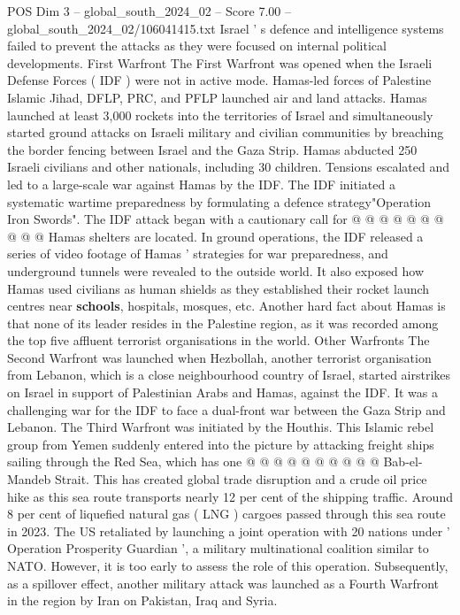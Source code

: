 \begin{textsample}{POS Dim 3 – global\_south\_2024\_02 – Score 7.00 – global\_south\_2024\_02/106041415.txt}
Israel ' s defence and intelligence systems failed to prevent the attacks as they were focused on internal political developments.
First Warfront The First Warfront was opened when the Israeli Defense Forces ( IDF ) were not in active mode.
Hamas-led forces of Palestine Islamic Jihad, DFLP, PRC, and PFLP launched air and land attacks.
Hamas launched at least 3,000 rockets into the territories of Israel and simultaneously started ground attacks on Israeli military and civilian communities by breaching the border fencing between Israel and the Gaza Strip.
Hamas abducted 250 Israeli civilians and other nationals, including 30 children.
Tensions escalated and led to a large-scale war against Hamas by the IDF.
The IDF initiated a systematic wartime preparedness by formulating a defence strategy"Operation Iron Swords".
The IDF attack began with a cautionary call for @ @ @ @ @ @ @ @ @ @ Hamas shelters are located.
In ground operations, the IDF released a series of video footage of Hamas ' strategies for war preparedness, and underground tunnels were revealed to the outside world.
It also exposed how Hamas used civilians as human shields as they established their rocket launch centres near \textbf{schools}, hospitals, mosques, etc.
Another hard fact about Hamas is that none of its leader resides in the Palestine region, as it was recorded among the top five affluent terrorist organisations in the world.
Other Warfronts The Second Warfront was launched when Hezbollah, another terrorist organisation from Lebanon, which is a close neighbourhood country of Israel, started airstrikes on Israel in support of Palestinian Arabs and Hamas, against the IDF.
It was a challenging war for the IDF to face a dual-front war between the Gaza Strip and Lebanon.
The Third Warfront was initiated by the Houthis.
This Islamic rebel group from Yemen suddenly entered into the picture by attacking freight ships sailing through the Red Sea, which has one @ @ @ @ @ @ @ @ @ @ Bab-el-Mandeb Strait.
This has created global trade disruption and a crude oil price hike as this sea route transports nearly 12 per cent of the shipping traffic.
Around 8 per cent of liquefied natural gas ( LNG ) cargoes passed through this sea route in 2023.
The US retaliated by launching a joint operation with 20 nations under ' Operation Prosperity Guardian ', a military multinational coalition similar to NATO.
However, it is too early to assess the role of this operation.
Subsequently, as a spillover effect, another military attack was launched as a Fourth Warfront in the region by Iran on Pakistan, Iraq and Syria.

\end{textsample}
